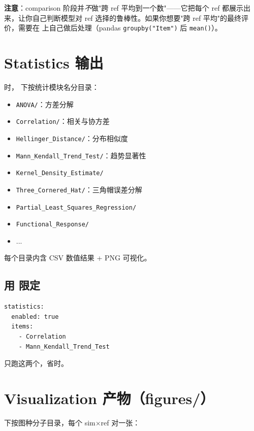 \textbf{注意}：comparison 阶段并\emph{不}做"跨 ref 平均到一个数"——它把每个 ref 都展示出来，让你自己判断模型对 ref 选择的鲁棒性。如果你想要"跨 ref 平均"的最终评价，需要在  上自己做后处理（pandas \texttt{groupby("Item")} 后 \texttt{mean()}）。

\section{Statistics 输出}

 时， 下按统计模块名分目录：

\begin{itemize}
  \item \texttt{ANOVA/}：方差分解
  \item \texttt{Correlation/}：相关与协方差
  \item \texttt{Hellinger\_Distance/}：分布相似度
  \item \texttt{Mann\_Kendall\_Trend\_Test/}：趋势显著性
  \item \texttt{Kernel\_Density\_Estimate/}
  \item \texttt{Three\_Cornered\_Hat/}：三角帽误差分解
  \item \texttt{Partial\_Least\_Squares\_Regression/}
  \item \texttt{Functional\_Response/}
  \item ...
\end{itemize}

每个目录内含 CSV 数值结果 + PNG 可视化。

\subsection{用  限定}

\begin{verbatim}
statistics:
  enabled: true
  items:
    - Correlation
    - Mann_Kendall_Trend_Test
\end{verbatim}

只跑这两个，省时。

\section{Visualization 产物（figures/）}

 下按图种分子目录，每个 sim×ref 对一张：

